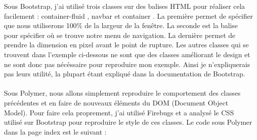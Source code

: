 \documentclass{article}
\begin{document}
Sous Bootstrap, j'ai utilis\'e trois classes sur des balises HTML pour r\'ealiser cela facilement : \og container-fluid \fg{}, \og navbar \fg{} et \og container \fg{}. La premi\`ere permet de sp\'ecifier que nous utiliserons 100\% de la largeur de la fen\^etre. La seconde est la balise pour sp\'ecifier o\`u se trouve notre menu de navigation. La derni\`ere permet de prendre la dimension en pixel avant le point de rupture. Les autres classes qui se trouvent dans l'exemple ci-dessous ne sont que des classes am\'eliorant le design et ne sont donc pas n\'ec\'essaire pour reproduire mon exemple. Ainsi je n'expliquerais pas leurs utilit\'e, la plupart \'etant expliqu\'e dans la documentation de Bootstrap. 
\vspace{0.5cm}\\
\vspace{0.5cm}\\
Sous Polymer, nous allons simplement reproduire le comportement des classes pr\'ec\'edentes et en faire de nouveaux \'el\'ements   du DOM (Document Object Model). Pour faire cela proprement, j'ai utilis\'e Firebugs et a analys\'e le CSS utilis\'e sur Bootstrap pour reproduire le style de ces classes. Le code sous Polymer dans la page index est le suivant :
\vspace{0.5cm}\\
\end{document}
